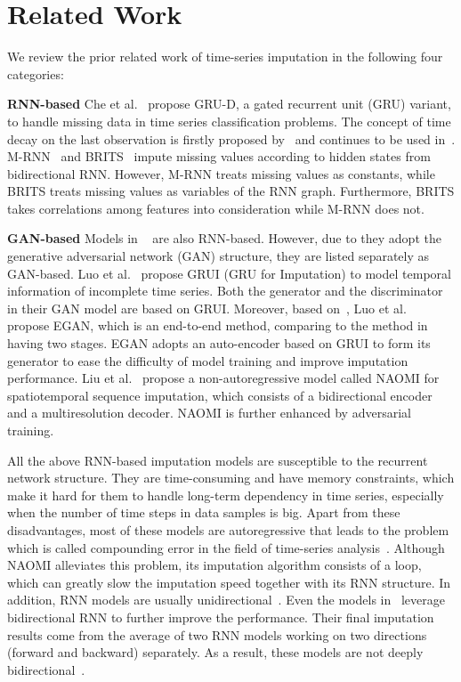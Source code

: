 \documentclass{article}
\begin{document}
\section{Related Work} \label{related_work}
We review the prior related work of time-series imputation in the following four categories:

\textbf{RNN-based} \hspace{1em} 
Che et al.~\cite{Che2018GRUD} propose GRU-D, a gated recurrent unit (GRU) variant, to handle missing data in time series classification problems. The concept of time decay on the last observation is firstly proposed by~\cite{Che2018GRUD} and continues to be used in~\cite{Cao2018BRITS, Yoon2019MRNN, Luo2018GRUI, Luo2019E2GAN}. M-RNN~\cite{Yoon2019MRNN} and BRITS~\cite{Cao2018BRITS} impute missing values according to hidden states from bidirectional RNN. However, M-RNN treats missing values as constants, while BRITS treats missing values as variables of the RNN graph. Furthermore, BRITS takes correlations among features into consideration while M-RNN does not.

\textbf{GAN-based} \hspace{1em}
Models in ~\cite{Luo2018GRUI,Luo2019E2GAN,Liu2019NAOMI} are also RNN-based. However, due to they adopt the generative adversarial network (GAN) structure, they are listed separately as GAN-based. Luo et al.~\cite{Luo2018GRUI} propose GRUI (GRU for Imputation) to model temporal information of incomplete time series. Both the generator and the discriminator in their GAN model are based on GRUI. Moreover, based on~\cite{Luo2018GRUI}, Luo et al.~\cite{Luo2019E2GAN} propose EGAN, which is an end-to-end method, comparing to the method in~\cite{Luo2018GRUI} having two stages. EGAN adopts an auto-encoder based on GRUI to form its generator to ease the difficulty of model training and improve imputation performance. Liu et al.~\cite{Liu2019NAOMI} propose a non-autoregressive model called NAOMI for spatiotemporal sequence imputation, which consists of a bidirectional encoder and a multiresolution decoder. NAOMI is further enhanced by adversarial training.

All the above RNN-based imputation models are susceptible to the recurrent network structure. They are time-consuming and have memory constraints, which make it hard for them to handle long-term dependency in time series, especially when the number of time steps in data samples is big. Apart from these disadvantages, most of these models are autoregressive that leads to the problem which is called compounding error in the field of time-series analysis~\cite{Venkatraman2015TimeSeries}. Although NAOMI alleviates this problem, its imputation algorithm consists of a loop, which can greatly slow the imputation speed together with its RNN structure. In addition, RNN models are usually unidirectional~\cite{Che2018GRUD,Luo2018GRUI,Luo2019E2GAN}. Even the models in~\cite{Cao2018BRITS,Yoon2019MRNN,Liu2019NAOMI} leverage bidirectional RNN to further improve the performance. Their final imputation results come from the average of two RNN models working on two directions (forward and backward) separately. As a result, these models are not deeply bidirectional~\cite{Devlin2019BERT}.
\end{document}
